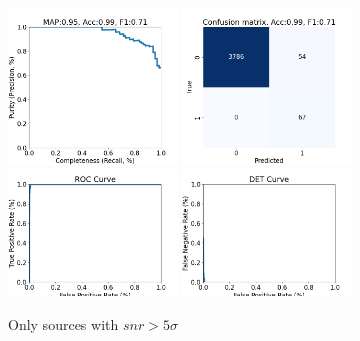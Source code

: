\documentclass[DM,authoryear,toc]{lsstdoc}
\begin{document}
\begin{figure}[h]
  \centering
  \includegraphics[width=0.4\textwidth]{precrec_13-resnet50-FullAugmentation-scratch-B64__0255000__npy_data_0.1.2-5sigma_256by256__posw_1.png}
  \includegraphics[width=0.4\textwidth]{confmat_13-resnet50-FullAugmentation-scratch-B64__0255000__npy_data_0.1.2-5sigma_256by256__posw_1.png}
  \includegraphics[width=0.4\textwidth]{roc_13-resnet50-FullAugmentation-scratch-B64__0255000__npy_data_0.1.2-5sigma_256by256__posw_1.png}
  \includegraphics[width=0.4\textwidth]{det_13-resnet50-FullAugmentation-scratch-B64__0255000__npy_data_0.1.2-5sigma_256by256__posw_1.png}
  \caption{Only sources with $snr > 5\sigma$}
  \label{fig:tract_templates}
\end{figure}
\end{document}
